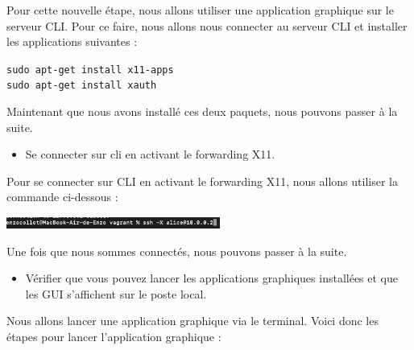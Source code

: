 \documentclass[12pt]{article}
\begin{document}
\vspace{0.3cm}

Pour cette nouvelle étape, nous allons utiliser une application graphique sur le serveur CLI. Pour ce faire, nous allons nous connecter au serveur CLI et installer les applications suivantes :

\texttt{sudo apt-get install x11-apps} \\
\texttt{sudo apt-get install xauth}

\vspace{0.3cm}

Maintenant que nous avons installé ces deux paquets, nous pouvons passer à la suite.

\vspace{0.3cm}

\begin{itemize}
  \item Se connecter sur cli en activant le forwarding X11.
\end{itemize}

\vspace{0.3cm}

Pour se connecter sur CLI en activant le forwarding X11, nous allons utiliser la commande ci-dessous :

\vspace{0.3cm}

\begin{center}
  \includegraphics[width=7cm]{Images-Client-SSH/Image-TD-SSH-7/SSH-Forwarding-X11.png}
\end{center}

\vspace{0.3cm}

Une fois que nous sommes connectés, nous pouvons passer à la suite.

\vspace{0.3cm}

\begin{itemize}
  \item Vérifier que vous pouvez lancer les applications graphiques installées et que les GUI s'affichent sur le poste local.
\end{itemize}

\vspace{0.3cm}

Nous allons lancer une application graphique via le terminal. Voici donc les étapes pour lancer l'application graphique :
\end{document}
